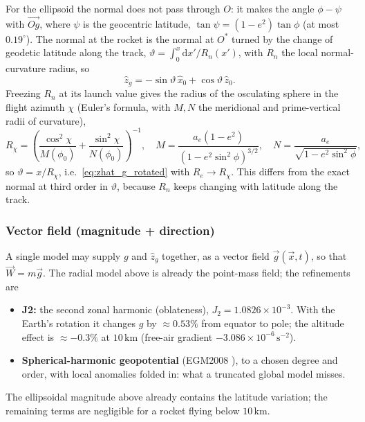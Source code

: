 For the ellipsoid the normal does not pass through $O$: it makes the angle $\phi-\psi$ with $\vec{Og}$,
where $\psi$ is the geocentric latitude, $\tan\psi=(1-e^2)\tan\phi$ (at most $0.19^\circ$). The
normal at the rocket is the normal at $O^*$ turned by the change of geodetic latitude along the
track, $\vartheta=\int_0^x \mathrm{d}x'/R_n(x')$, with $R_n$ the local normal-curvature radius, so
\begin{equation}\label{eq:zhat_g_ellipsoid}
    \hat{z}_g = -\sin\vartheta\,\hat{x}_0 + \cos\vartheta\,\hat{z}_0 .
\end{equation}
Freezing $R_n$ at its launch value gives the radius of the osculating sphere in the flight
azimuth $\chi$ (Euler's formula, with $M,N$ the meridional and prime-vertical radii of curvature),
\begin{equation}
    R_\chi = \left(\frac{\cos^2\chi}{M(\phi_0)} + \frac{\sin^2\chi}{N(\phi_0)}\right)^{-1},
    \quad M = \frac{a_e(1-e^2)}{(1-e^2\sin^2\phi)^{3/2}}, \quad
    N = \frac{a_e}{\sqrt{1-e^2\sin^2\phi}},
\end{equation}
so $\vartheta=x/R_\chi$, i.e.\ \autoref{eq:zhat_g_rotated} with $R_e\to R_\chi$.
This differs from the exact normal at third order in $\vartheta$, because $R_n$ keeps changing
with latitude along the track.

\subsubsection{Vector field (magnitude + direction)}
A single model may supply $g$ and $\hat{z}_g$ together, as a vector field
$\vec{g}(\vec{x},t)$, so that $\vec{W}=m\vec{g}$. The radial model above is already the point-mass
field; the refinements are
\begin{itemize}
    \item \textbf{J2:} the second zonal harmonic (oblateness), $J_2=1.0826\times10^{-3}$. With the
    Earth's rotation it changes $g$ by $\approx0.53\%$ from equator to pole; the altitude effect is
    $\approx-0.3\%$ at $10\,\mathrm{km}$ (free-air gradient $-3.086\times10^{-6}\,\mathrm{s^{-2}}$).
    \item \textbf{Spherical-harmonic geopotential} (EGM2008 \cite{pavlis}), to a chosen degree and
    order, with local anomalies folded in: what a truncated global model misses.
\end{itemize}
The ellipsoidal magnitude above already contains the latitude variation; the remaining terms are
negligible for a rocket flying below $10\,\mathrm{km}$.

